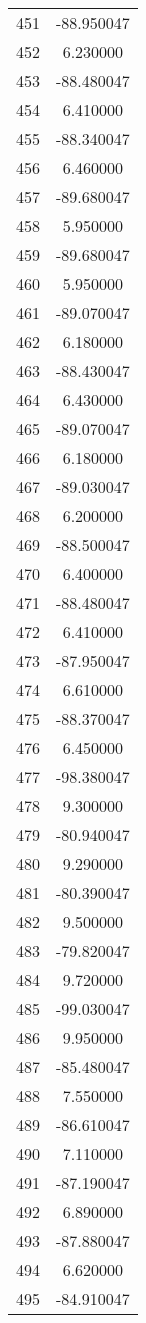 \documentclass[12pt]{article}
\begin{document}
\begin{longtable}{@{}cc@{}}
451 & -88.950047 \\
452 & 6.230000 \\
453 & -88.480047 \\
454 & 6.410000 \\
455 & -88.340047 \\
456 & 6.460000 \\
457 & -89.680047 \\
458 & 5.950000 \\
459 & -89.680047 \\
460 & 5.950000 \\
461 & -89.070047 \\
462 & 6.180000 \\
463 & -88.430047 \\
464 & 6.430000 \\
465 & -89.070047 \\
466 & 6.180000 \\
467 & -89.030047 \\
468 & 6.200000 \\
469 & -88.500047 \\
470 & 6.400000 \\
471 & -88.480047 \\
472 & 6.410000 \\
473 & -87.950047 \\
474 & 6.610000 \\
475 & -88.370047 \\
476 & 6.450000 \\
477 & -98.380047 \\
478 & 9.300000 \\
479 & -80.940047 \\
480 & 9.290000 \\
481 & -80.390047 \\
482 & 9.500000 \\
483 & -79.820047 \\
484 & 9.720000 \\
485 & -99.030047 \\
486 & 9.950000 \\
487 & -85.480047 \\
488 & 7.550000 \\
489 & -86.610047 \\
490 & 7.110000 \\
491 & -87.190047 \\
492 & 6.890000 \\
493 & -87.880047 \\
494 & 6.620000 \\
495 & -84.910047 \\

\end{longtable}
\end{document}
